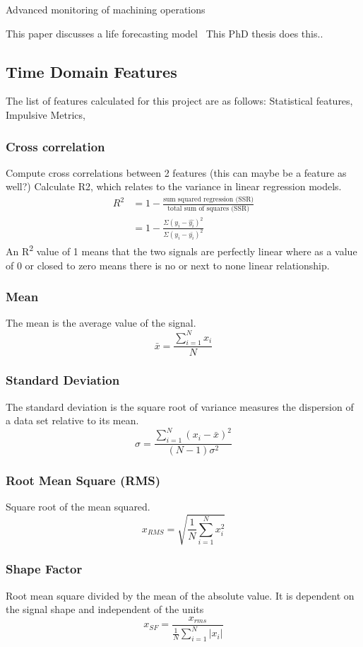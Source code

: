 \documentclass[]{article}
\begin{document}
Advanced monitoring of machining operations~\cite{teti2010advanced}


This paper discusses a life forecasting model~\cite{wang2016multiple}
This PhD thesis does this..~\cite{martin2017unsupervised}

\subsection{Time Domain Features} 	
The list of features calculated for this project are as follows:
Statistical features, Impulsive Metrics, 
\subsubsection*{Cross correlation}
Compute cross correlations between 2 features (this can maybe be a feature as well?)
Calculate R2, which relates to the variance in linear regression models.
\begin{align*}
 R^2 &= 1 - \frac{\textrm{sum squared regression (SSR)}}{\textrm{total sum of squares (SSR)}} \\ 
 &= 1 - \frac{\Sigma(y_i - \hat{y_i})^2}{\Sigma(y_i - \bar{y_i})^2} 
\end{align*}
An R\textsuperscript{2} value of 1 means that the two signals are perfectly linear where as a value of 0 or closed to zero means there is no or next to none linear relationship.
\subsubsection*{Mean}
The mean is the average value of the signal.
$$ \bar{x} = \frac{\sum^N_{i=1} x_i}{N} $$
\subsubsection*{Standard Deviation}  
The standard deviation is the square root of variance measures the dispersion of a data set relative to its mean. 
$$ \sigma =\frac{\sum^N_{i=1}(x_i-\bar{x})^2}{(N-1)\sigma^2} $$
\subsubsection*{Root Mean Square (\gls{RMS})}
Square root of the mean squared.
$$ x_{RMS} = \sqrt{\frac{1}{N} \sum^N_{i=1}x^2_i} $$
\subsubsection*{Shape Factor}
Root mean square divided by the mean of the absolute value. It is dependent on the signal shape and independent of the units
$$ x_{SF} = \frac{ x_{rms} }  {\frac{1}{N}\sum^N_{i=1}|x_i|} $$
\end{document}
